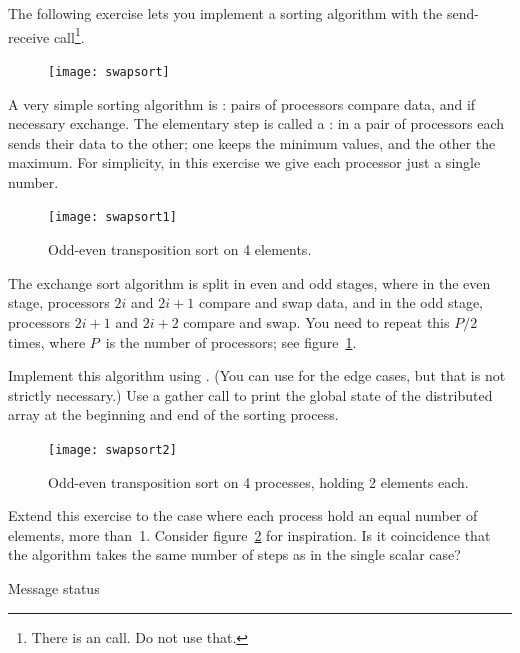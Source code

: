 The following exercise lets you implement a sorting algorithm with the
send-receive call\footnote {There is an 
  call. Do not use that.}.
%
\begin{exercise}
  \label{ex:exchangesort}
\begin{figure}
  \texttt{[image: swapsort]}
\end{figure}
%
  A very simple sorting algorithm is :
  pairs of processors compare data, and if necessary exchange. The
  elementary step is called a : in a pair
  of processors each sends their data to the other; one keeps the
  minimum values, and the other the maximum.
  For simplicity, in this exercise we give each processor just a single number.

  \begin{figure}[ht]
    \texttt{[image: swapsort1]}
    \caption{Odd-even transposition sort on 4 elements.}
    \label{fig:swapsort1}
  \end{figure}

  The exchange sort algorithm is split in even and odd stages, where
  in the even stage, processors $2i$ and $2i+1$ compare and swap data,
  and in the odd stage, processors $2i+1$ and $2i+2$ compare and swap.
  You need to repeat this $P/2$ times, where $P$~is the number of
  processors; see figure~\ref{fig:swapsort1}.

  Implement this algorithm using . (You can use
   for the edge cases, but that is not strictly necessary.)
  Use a gather call to print the global state of the distributed array
  at the beginning and end of the sorting process.
\end{exercise}

  \begin{figure}[ht]
    \texttt{[image: swapsort2]}
    \caption{Odd-even transposition sort on 4 processes, holding 2
      elements each.}
    \label{fig:swapsort2}
  \end{figure}

\begin{exercise}
  Extend this exercise to the case where each process hold an equal
  number of elements, more than~1. Consider figure~\ref{fig:swapsort2}
  for inspiration. Is it coincidence that the algorithm takes the same
  number of steps as in the single scalar case?
\end{exercise}

 {Message status}
\label{sec:mpi-status}

